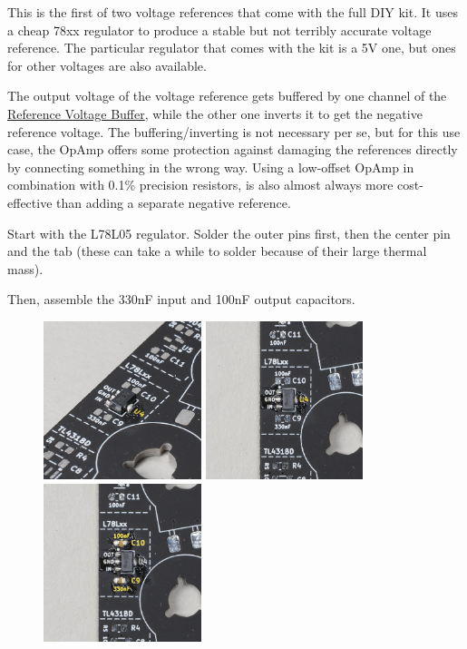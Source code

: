 \documentclass[12pt, a4paper]{article}
\begin{document}
This is the first of two voltage references that come with the full DIY kit. It uses a cheap
78xx regulator to produce a stable but not terribly accurate voltage reference. The particular
regulator that comes with the kit is a 5V one, but ones for other voltages are also available.

The output voltage of the voltage reference gets buffered by one channel of the
\hyperref[sec:reference_voltage_buffer]{Reference Voltage Buffer}, while the other one inverts
it to get the negative reference voltage. The buffering/inverting is not necessary per se, but
for this use case, the OpAmp offers some protection against damaging the references directly
by connecting something in the wrong way. Using a low-offset OpAmp in combination with 0.1\%
precision resistors, is also almost always more cost-effective than adding a separate negative
reference.

Start with the L78L05 regulator. Solder the outer pins first, then the center pin and the tab
(these can take a while to solder because of their large thermal mass).

Then, assemble the 330nF input and 100nF output capacitors.

\begin{figure}[H]
    \centering
    \includegraphics[width=46mm]{images/15_01_regulator_tab_soldered.jpg}
    \hspace{2mm}
    \includegraphics[width=46mm]{images/15_02_regulator_fully_soldered.jpg}
    \hspace{2mm}
    \includegraphics[width=46mm]{images/15_03_caps_soldered.jpg}
\end{figure}
\end{document}
